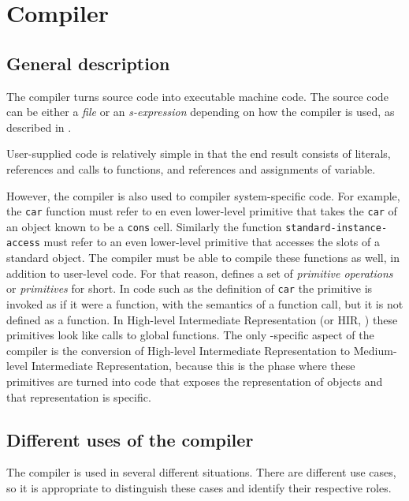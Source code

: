 \chapter{Compiler}
\label{chap-compiler}

\section{General description}

The \sysname{} compiler turns source code into executable machine
code.  The source code can be either a \emph{file} or an
\emph{s-expression} depending on how the compiler is used, as
described in .

User-supplied code is relatively simple in that the end result
consists of literals, references and calls to functions, and
references and assignments of variable.

However, the compiler is also used to compiler system-specific code.
For example, the \texttt{car} function must refer to en even
lower-level primitive that takes the \texttt{car} of an object known
to be a \texttt{cons} cell.  Similarly the function
\texttt{standard-instance-access} must refer to an even lower-level
primitive that accesses the slots of a standard object.  The compiler
must be able to compile these functions as well, in addition to
user-level code.  For that reason, \sysname{} defines a set of
\emph{primitive operations} or \emph{primitives} for short.  In code
such as the definition of \texttt{car} the primitive is invoked as if
it were a function, with the semantics of a function call, but it is
not defined as a function.  In High-level Intermediate Representation
(or HIR, ) these primitives
look like calls to global functions.  The only \sysname{}-specific
aspect of the compiler is the conversion of High-level Intermediate
Representation to Medium-level Intermediate Representation, because
this is the phase where these primitives are turned into code that
exposes the representation of objects and that representation is
\sysname{} specific.

\section{Different uses of the compiler}
\label{sec-different-uses-of-the-compiler}

The compiler is used in several different situations.  There are
different use cases, so it is appropriate to distinguish these cases
and identify their respective roles.

